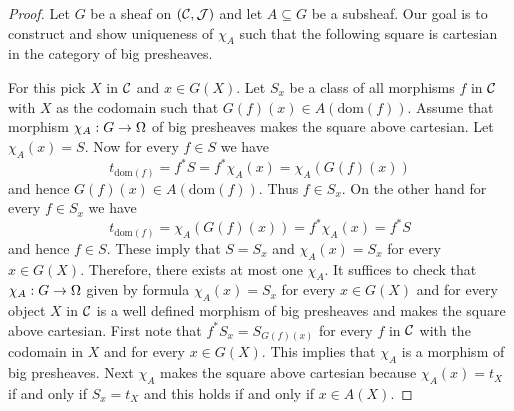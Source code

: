 \begin{proof}
Let $G$ be a sheaf on $({\mathcal C},{\mathcal J})$ and let $A\subseteq G$ be a subsheaf. Our goal is to construct and show uniqueness of $\chi_A$ such that the following square is cartesian in the category of big presheaves.
\begin{center}
\end{center}
For this pick $X$ in ${\mathcal C}$ and $x\in G(X)$. Let $S_x$ be a class of all morphisms $f$ in ${\mathcal C}$ with $X$ as the codomain such that $G(f)(x)\in A(\mathrm{dom}(f))$. Assume that morphism $\chi_A:G\rightarrow \Omega$ of big presheaves makes the square above cartesian. Let $\chi_A(x) = S$. Now for every $f\in S$ we have
$$t_{\mathrm{dom}(f)} = f^*S = f^*\chi_A(x) = \chi_A\left(G(f)(x)\right)$$
and hence $G(f)(x) \in A(\mathrm{dom}(f))$. Thus $f\in S_x$. On the other hand for every $f\in S_x$ we have
$$t_{\mathrm{dom}(f)} = \chi_A\left(G(f)(x)\right) = f^*\chi_A(x) =  f^*S$$
and hence $f\in S$. These imply that $S = S_x$ and $\chi_A(x) = S_x$ for every $x\in G(X)$. Therefore, there exists at most one $\chi_A$. It suffices to check that $\chi_A:G\rightarrow \Omega$ given by formula $\chi_A(x) = S_x$ for every $x\in G(X)$ and for every object $X$ in ${\mathcal C}$ is a well defined morphism of big presheaves and makes the square above cartesian. First note that $f^*S_x =S_{G(f)(x)}$ for every $f$ in ${\mathcal C}$ with the codomain in $X$ and for every $x\in G(X)$. This implies that $\chi_A$ is a morphism of big presheaves. Next $\chi_A$ makes the square above cartesian because $\chi_A(x) = t_X$ if and only if $S_x = t_X$ and this holds  if and only if $x\in A(X)$.
\end{proof}


